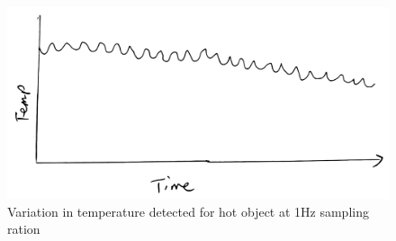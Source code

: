 \documentclass[../thesis/thesis.tex]{subfiles}
\begin{document}
\begin{figure}
\centering
\includegraphics[width=\textwidth]{../diagrams/temp/cooldown.pdf}
\caption{Variation in temperature detected for hot object at 1Hz sampling ration}
\label{fig:cooldown}
\end{figure}
 
\end{document}
